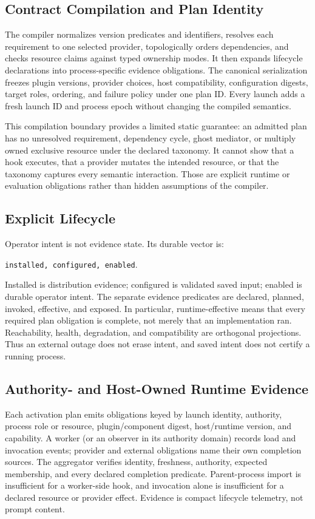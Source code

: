\documentclass[letterpaper,twocolumn,10pt]{article}
\newcommand{\code}[1]{\texttt{#1}}
\begin{document}
\subsection{Contract Compilation and Plan Identity}
The compiler normalizes version predicates and identifiers, resolves each
requirement to one selected provider, topologically orders dependencies, and
checks resource claims against typed ownership modes.  It then expands
lifecycle declarations into process-specific evidence obligations.  The
canonical serialization freezes plugin versions, provider choices, host
compatibility, configuration digests, target roles, ordering, and failure
policy under one plan ID.  Every launch adds a fresh launch ID and process
epoch without changing the compiled semantics.

This compilation boundary provides a limited static guarantee: an admitted
plan has no unresolved requirement, dependency cycle, ghost mediator, or
multiply owned exclusive resource under the declared taxonomy.  It cannot show
that a hook executes, that a provider mutates the intended resource, or that
the taxonomy captures every semantic interaction.  Those are explicit runtime
or evaluation obligations rather than hidden assumptions of the compiler.

\subsection{Explicit Lifecycle}
Operator intent is not evidence state.  Its durable vector is:
\begin{center}
\code{installed, configured, enabled}.
\end{center}
Installed is distribution evidence; configured is validated saved input;
enabled is durable operator intent.  The separate evidence predicates are
declared, planned, invoked, effective, and exposed.  In particular,
runtime-effective means that every required plan obligation is complete, not
merely that an implementation ran.  Reachability, health, degradation, and
compatibility are orthogonal projections.  Thus an external outage does not
erase intent, and saved intent does not certify a running process.

\subsection{Authority- and Host-Owned Runtime Evidence}
Each activation plan emits obligations keyed by launch identity, authority,
process role or resource, plugin/component digest, host/runtime version, and
capability.  A worker (or an observer in its authority domain) records load and
invocation events; provider and external obligations name their own completion
sources.  The aggregator verifies identity, freshness, authority, expected
membership, and every declared completion predicate.  Parent-process import is
insufficient for a worker-side hook, and invocation alone is insufficient for a
declared resource or provider effect.  Evidence is compact lifecycle telemetry,
not prompt content.
\end{document}
